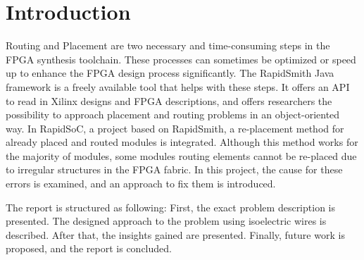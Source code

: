 \chapter{Introduction}
\label{cha:introduction}

Routing and Placement are two necessary and time-consuming steps in the FPGA synthesis toolchain. These processes can sometimes be optimized or speed up to enhance the FPGA design process significantly. The RapidSmith\cite{lavin2010rapid} Java framework is a freely available tool that helps with these steps. It offers an API to read in Xilinx designs and FPGA descriptions, and offers researchers the possibility to approach placement and routing problems in an object-oriented way. In RapidSoC\cite{wenzel2016rapidsoc}, a project based on RapidSmith, a re-placement method for already placed and routed modules is integrated. Although this method works for the majority of modules, some modules routing elements cannot be re-placed due to irregular structures in the FPGA fabric. In this project, the cause for these errors is examined, and an approach to fix them is introduced.

The report is structured as following: First, the exact problem description is presented. The designed approach to the problem using isoelectric wires is described. After that, the insights gained are presented. Finally, future work is proposed, and the report is concluded.


